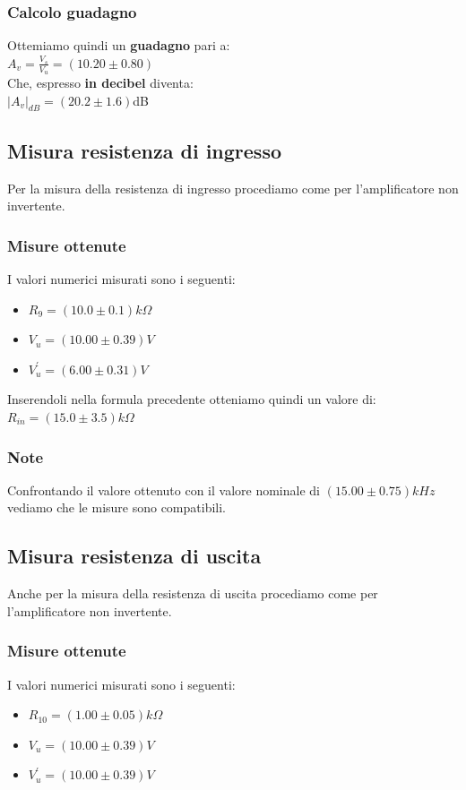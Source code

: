 \documentclass{article}
\begin{document}
\subsubsection{Calcolo guadagno}
Ottemiamo quindi un \textbf{guadagno} pari a:\\ \large $A_v = \frac{V_s}{V_u} = (10.20 \pm 0.80)$ \normalsize \\Che, espresso \textbf{in decibel} diventa:\\ \large $ |A_v|_{dB} = (20.2 \pm 1.6)$dB \normalsize
\subsection{Misura resistenza di ingresso}
Per la misura della resistenza di ingresso procediamo come per l'amplificatore non invertente.
\subsubsection{Misure ottenute}
I valori numerici misurati sono i seguenti:
\begin{itemize}
	\item \large $R_{9} = (10.0 \pm 0.1)k\Omega$
	\item \large $V_{u} = (10.00 \pm 0.39)V$
	\item \large $V_{u}^{'} = (6.00 \pm 0.31)V$
\end{itemize}
Inserendoli nella formula precedente otteniamo quindi un valore di: \\ \large $R_{in} = (15.0 \pm 3.5)k\Omega$
\subsubsection{Note}
Confrontando il valore ottenuto con il valore nominale di $(15.00 \pm 0.75)kHz$ vediamo che le misure sono compatibili.
\subsection{Misura resistenza di uscita}
Anche per la misura della resistenza di uscita procediamo come per l'amplificatore non invertente.
\subsubsection{Misure ottenute}
I valori numerici misurati sono i seguenti:
\begin{itemize}
	\item \large $R_{10} = (1.00 \pm 0.05)k\Omega$
	\item \large $V_{u} = (10.00 \pm 0.39)V$
	\item \large $V_{u}^{'} = (10.00 \pm 0.39)V$
\end{itemize}
\end{document}
